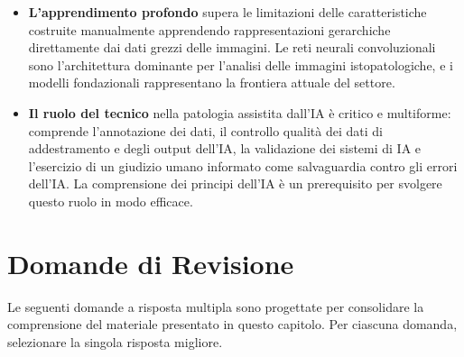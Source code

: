 \begin{itemize}
    \item \textbf{L'apprendimento profondo} supera le limitazioni delle caratteristiche costruite manualmente apprendendo rappresentazioni gerarchiche direttamente dai dati grezzi delle immagini. Le reti neurali convoluzionali sono l'architettura dominante per l'analisi delle immagini istopatologiche, e i modelli fondazionali rappresentano la frontiera attuale del settore.

    \item \textbf{Il ruolo del tecnico} nella patologia assistita dall'IA è critico e multiforme: comprende l'annotazione dei dati, il controllo qualità dei dati di addestramento e degli output dell'IA, la validazione dei sistemi di IA e l'esercizio di un giudizio umano informato come salvaguardia contro gli errori dell'IA. La comprensione dei principi dell'IA è un prerequisito per svolgere questo ruolo in modo efficace.
\end{itemize}

\section{Domande di Revisione}
\label{sec:ch3_questions}

Le seguenti domande a risposta multipla sono progettate per consolidare la comprensione del materiale presentato in questo capitolo. Per ciascuna domanda, selezionare la singola risposta migliore.

